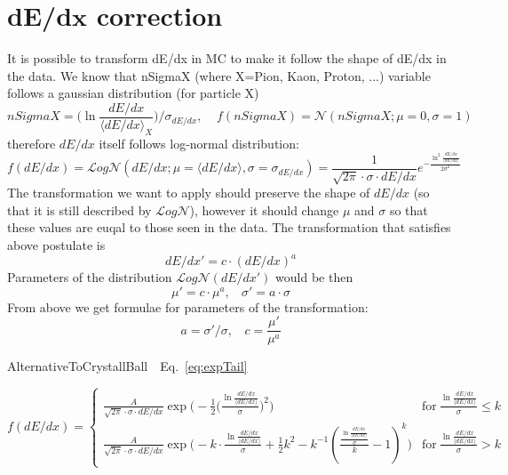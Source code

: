 

\chapter{\texorpdfstring{d$\bm{E}$/d$\bm{x}$}{dE/dx} correction}\label{chap:dEdxCorrection}

It is possible to transform dE/dx in MC to make it follow the shape of dE/dx in the data. 
We know that nSigmaX (where X=Pion, Kaon, Proton, ...) variable follows a gaussian distribution (for particle X)
 \[nSigmaX = \Big( \ln{\frac{dE/dx}{\langle dE/dx\rangle_{X}}} \Big) / \sigma_{dE/dx},~~~~~f(nSigmaX) = \mathcal{N}(nSigmaX; \mu=0,\sigma=1)\]
therefore $dE/dx$ itself follows log-normal distribution:
\[f(dE/dx) = \mathcal{L}og\mathcal{N}(dE/dx; \mu=\langle dE/dx\rangle,\sigma=\sigma_{dE/dx}) = \frac{1}{\sqrt{2\pi}\cdot \sigma\cdot dE/dx}e^{-\frac{\ln^{2}{\frac{dE/dx}{\langle dE/dx\rangle}}}{2\sigma^{2}}}\]
The transformation we want to apply should preserve the shape of $dE/dx$ (so that it is still described by $\mathcal{L}og\mathcal{N}$), however it should change $\mu$ and $\sigma$ so that these values are euqal to those seen in the data. The transformation that satisfies above postulate is
\[dE/dx' = c\cdot (dE/dx)^{a}\]
Parameters of the distribution $\mathcal{L}og\mathcal{N}(dE/dx')$ would be then
\[\mu' = c\cdot\mu^{a},~~~~\sigma' = a\cdot\sigma\]
From above we get formulae for parameters of the transformation:
\[a=\sigma'/\sigma,~~~~c = \frac{\mu'}{\mu^{a}}\]

AlternativeToCrystallBall~\cite{AlternativeToCrystallBall}~Eq.~\eqref{eq:expTail}

\begin{equation}\label{eq:expTail}
	f(dE/dx)=\left\{
                \begin{array}{ll}
                  \frac{A}{\sqrt{2\pi}\cdot \sigma\cdot dE/dx}\exp{\Bigg(-\frac{1}{2}\Big(\frac{\ln{\frac{dE/dx}{\langle dE/dx\rangle}}}{\sigma}\Big)^{2}\Bigg)} & \textrm{for}~\frac{\ln{\frac{dE/dx}{\langle dE/dx\rangle}}}{\sigma} \leq k \\
                  \frac{A}{\sqrt{2\pi}\cdot \sigma\cdot dE/dx}\exp{\Bigg(-k\cdot \frac{\ln{\frac{dE/dx}{\langle dE/dx\rangle}}}{\sigma} + \frac{1}{2}k^{2} - k^{-1}\left(\frac{\frac{\ln{\frac{dE/dx}{\langle dE/dx\rangle}}}{\sigma}}{k}-1\right)^{k} \Bigg)} & \textrm{for}~\frac{\ln{\frac{dE/dx}{\langle dE/dx\rangle}}}{\sigma} > k
                \end{array}
              \right.
\end{equation}



